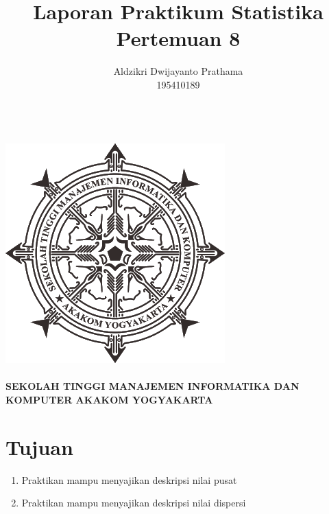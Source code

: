 \documentclass[a4paper,12pt]{article}
\begin{document}
\title{Laporan Praktikum Statistika Pertemuan 8}
\author{Aldzikri Dwijayanto Prathama 
	\\195410189}
\makeatletter
\begin{titlepage}
	\begin{center}
		{\huge \bfseries \@title }\\[14ex]
		\includegraphics[scale=.8]{logo}\\[4ex]
		{\large \@author}\\[20ex]
		{\large \bfseries {SEKOLAH TINGGI MANAJEMEN INFORMATIKA DAN KOMPUTER
				AKAKOM YOGYAKARTA}}
	\end{center}


\end{titlepage}
\makeatother
\newpage
\tableofcontents
\newpage
\section{Tujuan}
\begin{enumerate}
	\item Praktikan mampu menyajikan deskripsi nilai pusat 
	\item Praktikan mampu menyajikan deskripsi nilai dispersi
\end{enumerate}
\end{document}
